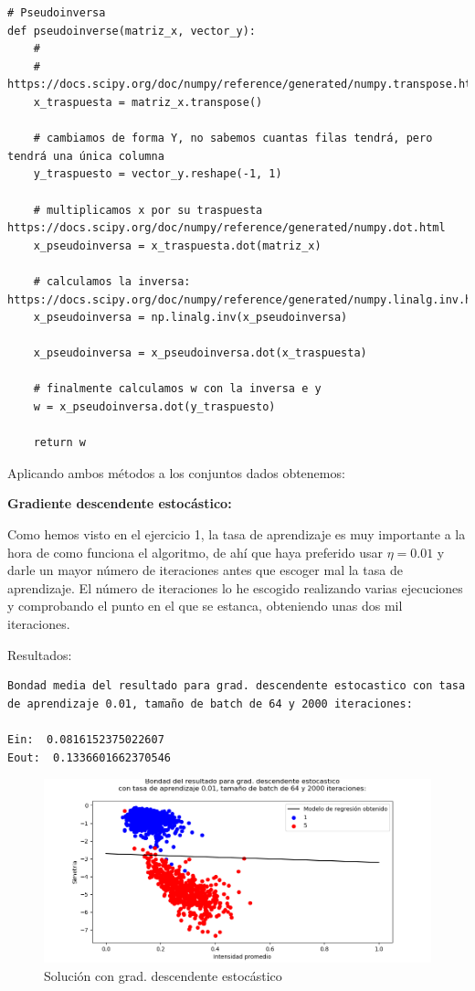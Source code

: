 \documentclass[12pt, spanish]{article}
\begin{document}
\begin{lstlisting}
# Pseudoinversa
def pseudoinverse(matriz_x, vector_y):
    #
	# https://docs.scipy.org/doc/numpy/reference/generated/numpy.transpose.html
	x_traspuesta = matriz_x.transpose()

	# cambiamos de forma Y, no sabemos cuantas filas tendrá, pero tendrá una única columna
	y_traspuesto = vector_y.reshape(-1, 1)

	# multiplicamos x por su traspuesta https://docs.scipy.org/doc/numpy/reference/generated/numpy.dot.html
	x_pseudoinversa = x_traspuesta.dot(matriz_x)

	# calculamos la inversa: https://docs.scipy.org/doc/numpy/reference/generated/numpy.linalg.inv.html
	x_pseudoinversa = np.linalg.inv(x_pseudoinversa)

	x_pseudoinversa = x_pseudoinversa.dot(x_traspuesta)

	# finalmente calculamos w con la inversa e y
	w = x_pseudoinversa.dot(y_traspuesto)

	return w
\end{lstlisting}


Aplicando ambos métodos a los conjuntos dados obtenemos:

\newpage

\textbf{Gradiente descendente estocástico:}

Como hemos visto en el ejercicio 1, la tasa de aprendizaje es muy importante a la hora de como funciona el algoritmo, de ahí que haya preferido usar $\eta = 0.01$ y darle un mayor número de iteraciones antes que escoger mal la tasa de aprendizaje. El número de iteraciones lo he escogido realizando varias ejecuciones y comprobando el punto en el que se estanca, obteniendo unas dos mil iteraciones.

Resultados:

\begin{lstlisting}
Bondad media del resultado para grad. descendente estocastico con tasa de aprendizaje 0.01, tamaño de batch de 64 y 2000 iteraciones:

Ein:  0.0816152375022607
Eout:  0.1336601662370546
\end{lstlisting}


\begin{figure}[H]
  \centering
      \includegraphics[scale = 0.70]{ej2-1-sgd.png}
 		 \caption{Solución con grad. descendente estocástico}
  		\label{fig:ej2-1-sgd}

\end{figure}
\end{document}

